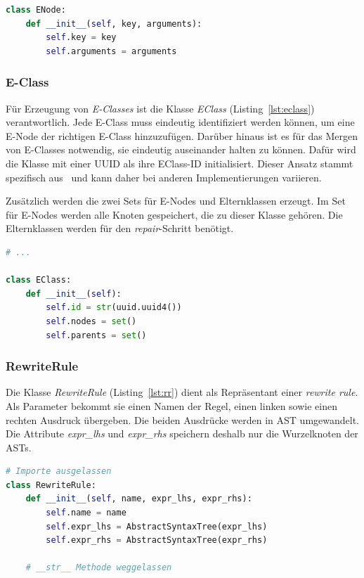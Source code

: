 \begin{lstlisting}[language=Python, caption=Klasse \textit{ENode}, label={lst:enode}]
class ENode:
    def __init__(self, key, arguments):
        self.key = key
        self.arguments = arguments
\end{lstlisting}

\subsubsection{E-Class}

Für Erzeugung von \textit{E-Classes} ist die Klasse \textit{EClass} (Listing~\ref{lst:eclass}) verantwortlich. 
Jede E-Class muss eindeutig identifiziert werden können, um eine E-Node der richtigen E-Class hinzuzufügen.
Darüber hinaus ist es für das Mergen von E-Classes notwendig, sie eindeutig auseinander halten zu können.
Dafür wird die Klasse mit einer UUID als ihre EClass-ID initialisiert. Dieser Ansatz stammt spezifisch aus~\cite{2021-egg}
und kann daher bei anderen Implementierungen variieren.

Zusätzlich werden die zwei Sets für E-Nodes und Elternklassen erzeugt.
Im Set für E-Nodes werden alle Knoten gespeichert, die zu dieser Klasse gehören.
Die Elternklassen werden für den \textit{repair}-Schritt benötigt.

\begin{lstlisting}[language=Python, caption=Klasse \textit{EClass}, label={lst:eclass}]
# ... 

class EClass:
    def __init__(self):
        self.id = str(uuid.uuid4())
        self.nodes = set()
        self.parents = set()
\end{lstlisting}

\subsubsection{RewriteRule}

Die Klasse \textit{RewriteRule} (Listing~\ref{lst:rr}) dient als Repräsentant einer \textit{rewrite rule}. Als Parameter bekommt sie einen Namen der Regel, einen linken sowie einen 
rechten Ausdruck übergeben. Die beiden Ausdrücke werden in AST umgewandelt. Die Attribute \textit{expr\_lhs} und \textit{expr\_rhs} speichern deshalb nur die Wurzelknoten der ASTs.

\begin{lstlisting}[language=Python, caption=Klasse \textit{RewriteRule}, label={lst:rr}]
# Importe ausgelassen 
class RewriteRule:
    def __init__(self, name, expr_lhs, expr_rhs):
        self.name = name
        self.expr_lhs = AbstractSyntaxTree(expr_lhs)
        self.expr_rhs = AbstractSyntaxTree(expr_rhs)

    # __str__ Methode weggelassen 
\end{lstlisting}

